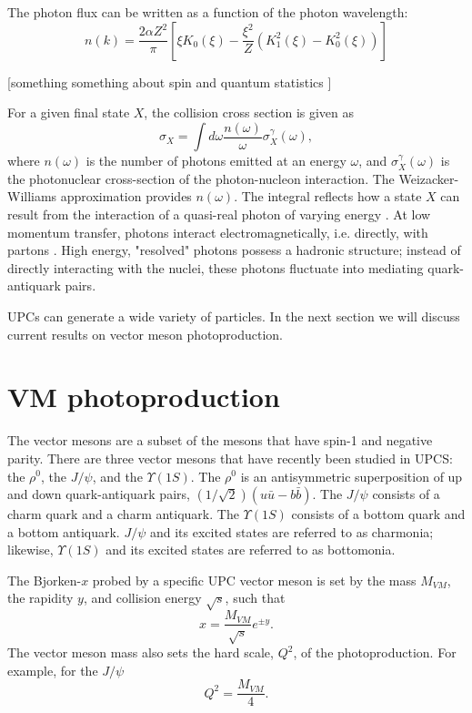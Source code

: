 The photon flux can be written as a function of the photon wavelength:
\begin{equation}
n(k) = \frac{2 \alpha Z^2}{\pi}\left [ \xi K_0(\xi) - \frac{\xi^2}{Z}(K_1^2(\xi)-K_0^2(\xi)) \right ]
\end{equation}

[something something about spin and quantum statistics \cite{Hufner:1996jw} ]

For a given final state $X$, the collision cross section is given as
\begin{equation}
\sigma_X = \int d \omega \frac{n(\omega)}{\omega} \sigma_X^\gamma(\omega),
\end{equation}
where $n(\omega)$ is the number of photons emitted at an energy $\omega$, and $\sigma_X^\gamma(\omega)$ is the photonuclear cross-section of the photon-nucleon interaction. The Weizacker-Williams approximation provides $n(\omega)$. The integral reflects how a state $X$ can result from the interaction of a quasi-real photon of varying energy \cite{Nystrand:2004vn}. At low momentum transfer, photons interact electromagnetically, i.e. directly, with partons \cite{photonALICE}. High energy, "resolved" photons possess a hadronic structure; instead of directly interacting with the nuclei, these photons fluctuate into mediating quark-antiquark pairs.

UPCs can generate a wide variety of particles. In the next section we will discuss current results on vector meson photoproduction.

\section{VM photoproduction}
The vector mesons are a subset of the mesons that have spin-1 and negative parity. There are three vector mesons that have recently been studied in UPCS: the $\rho^0$, the $J/\psi$, and the $\Upsilon(1S)$. The $\rho^0$ is an antisymmetric superposition of up and down quark-antiquark pairs, $(1/\sqrt{2})(u\bar{u}-b\bar{b})$. The $J/\psi$ consists of a charm quark and a charm antiquark. The $\Upsilon(1S)$ consists of a bottom quark and a bottom antiquark. $J/\psi$ and its excited states are referred to as charmonia; likewise, $\Upsilon(1S)$ and its excited states are referred to as bottomonia.

The Bjorken-$x$ probed by a specific UPC vector meson is set by the mass $M_{VM}$, the rapidity $y$, and collision energy $\sqrt{s}$, such that
\begin{equation}
x = \frac{M_{VM}}{\sqrt{s}}e^{\pm y}.
\end{equation} The vector meson mass also sets the hard scale, $Q^2$, of the photoproduction. For example, for the $J/\psi$
\begin{equation}
Q^2 = \frac{M_{VM}}{4}.
\end{equation}

